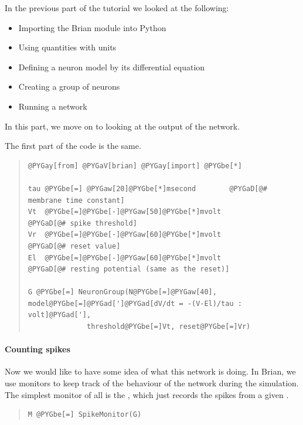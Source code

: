 \documentclass[letterpaper,10pt,english]{manual}
\begin{document}
In the previous part of the tutorial we looked at the following:
\begin{itemize}
\item {} 
Importing the Brian module into Python

\item {} 
Using quantities with units

\item {} 
Defining a neuron model by its differential equation

\item {} 
Creating a group of neurons

\item {} 
Running a network

\end{itemize}

In this part, we move on to looking at the output of the network.

The first part of the code is the same.
\begin{quote}

\begin{Verbatim}[commandchars=@\[\]]
@PYGay[from] @PYGaV[brian] @PYGay[import] @PYGbe[*]

tau @PYGbe[=] @PYGaw[20]@PYGbe[*]msecond        @PYGaD[@# membrane time constant]
Vt  @PYGbe[=]@PYGbe[-]@PYGaw[50]@PYGbe[*]mvolt          @PYGaD[@# spike threshold]
Vr  @PYGbe[=]@PYGbe[-]@PYGaw[60]@PYGbe[*]mvolt          @PYGaD[@# reset value]
El  @PYGbe[=]@PYGbe[-]@PYGaw[60]@PYGbe[*]mvolt          @PYGaD[@# resting potential (same as the reset)]

G @PYGbe[=] NeuronGroup(N@PYGbe[=]@PYGaw[40], model@PYGbe[=]@PYGad[']@PYGad[dV/dt = -(V-El)/tau : volt]@PYGad['],
              threshold@PYGbe[=]Vt, reset@PYGbe[=]Vr)
\end{Verbatim}
\end{quote}


\paragraph{Counting spikes}

Now we would like to have some idea of what this network is
doing. In Brian, we use monitors to keep track of the behaviour
of the network during the simulation. The simplest monitor of
all is the \hyperlink{brian.SpikeMonitor}{}, which just records the spikes from a
given \hyperlink{brian.NeuronGroup}{}.
\begin{quote}

\begin{Verbatim}[commandchars=@\[\]]
M @PYGbe[=] SpikeMonitor(G)
\end{Verbatim}
\end{quote}
\end{document}

